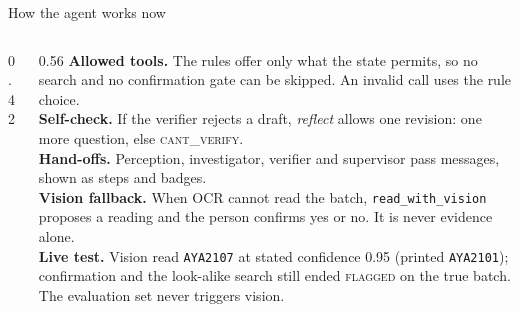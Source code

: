 \documentclass[aspectratio=169,11pt]{beamer}
\newcommand{\V}[1]{\textsc{\lowercase{#1}}}
\begin{document}
\begin{frame}{How the agent works now}
\small
\begin{columns}[T]
\begin{column}{0.42\textwidth}
\centering
{}
\end{column}
\begin{column}{0.56\textwidth}
\footnotesize
\setlength{\parskip}{0pt}
\textbf{\color{teal}Allowed tools.} The rules offer only what the state permits, so no search and no confirmation gate can be skipped. An invalid call uses the rule choice.\\[1mm]
\textbf{\color{teal}Self-check.} If the verifier rejects a draft, \emph{reflect} allows one revision: one more question, else \V{CANT\_VERIFY}.\\[1mm]
\textbf{\color{teal}Hand-offs.} Perception, investigator, verifier and supervisor pass messages, shown as steps and badges.\\[1mm]
\textbf{\color{teal}Vision fallback.} When OCR cannot read the batch, \texttt{read\_with\_vision} proposes a reading and the person confirms yes or no. It is never evidence alone.\\[1mm]
\textbf{\color{amber}Live test.} Vision read \texttt{AYA2107} at stated confidence 0.95 (printed \texttt{AYA2101}); confirmation and the look-alike search still ended \V{FLAGGED} on the true batch. The evaluation set never triggers vision.
\end{column}
\end{columns}
\end{frame}
\end{document}
